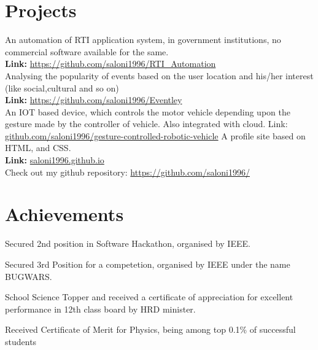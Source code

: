 \documentclass[]{hieudo-build}
\begin{document}
\begin{minipage}[t]{0.69\textwidth} 

\section{Projects}

\descript{}
An automation of RTI application system, in government institutions, no commercial software available for the same. \\
\textbf{Link:} \url{https://github.com/saloni1996/RTI_Automation}
\sectionsep\\
\descript{}
Analysing the popularity of events based on the user location and his/her interest (like social,cultural and so on)\\
\textbf{Link:} \url{https://github.com/saloni1996/Eventley}
\sectionsep\\
\descript{}
An IOT based device, which controls the motor vehicle depending upon the gesture made by the controller of vehicle. Also integrated with cloud.
Link: \url{github.com/saloni1996/gesture-controlled-robotic-vehicle}
\sectionsep 
{}
\descript{}
A profile site based on HTML, and CSS. \\
 \textbf{Link:} \url{saloni1996.github.io}
\sectionsep\\
\descript{}
Check out my github repository: \url{https://github.com/saloni1996/}
\sectionsep

\section{Achievements}

\vspace{0.5em} 
\begin{tightemize}

\item Secured 2nd position in Software Hackathon, organised by IEEE.
\item Secured 3rd Position for a competetion, organised by IEEE under the name BUGWARS.
\item School Science Topper and received a certificate of appreciation for excellent performance in 12th class board by HRD minister.
\item Received Certificate of Merit for Physics, being among top 0.1\% of successful students
\end{tightemize}
\sectionsep



\end{minipage}
\end{document}
